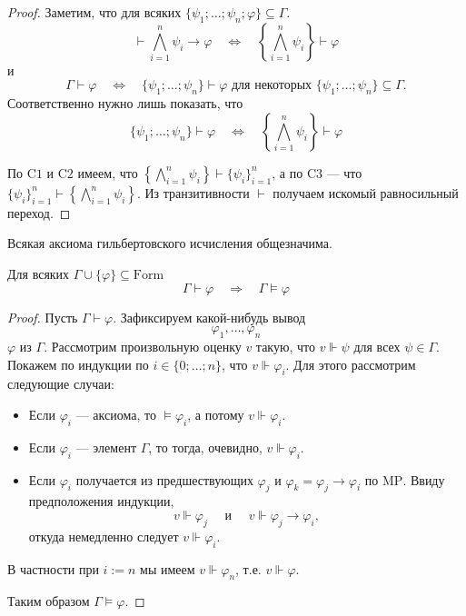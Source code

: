 \documentclass[12pt,a4paper]{article}
\newcommand{\Formul}{\ensuremath{\mathrm{Form}}\xspace}
\begin{document}
    \begin{proof}
        Заметим, что для всяких $\{\psi_1; \dots; \psi_n; \varphi\} \subseteq \Gamma$.
        \[
            \vdash \bigwedge_{i=1}^n \psi_i \rightarrow \varphi
            \quad \Longleftrightarrow \quad
            \left\{\bigwedge_{i=1}^n \psi_i\right\} \vdash \varphi
        \]
        и
        \[
            \Gamma \vdash \varphi
            \quad \Longleftrightarrow \quad
            \{\psi_1; \dots; \psi_n\} \vdash \varphi \text{ для некоторых } \{\psi_1; \dots; \psi_n\} \subseteq \Gamma.
        \]
        Соответственно нужно лишь показать, что
        \[
            \{\psi_1; \dots; \psi_n\} \vdash \varphi
            \quad \Longleftrightarrow \quad
            \left\{\bigwedge_{i=1}^n \psi_i\right\} \vdash \varphi
        \]

        По $\mathrm{C1}$ и $\mathrm{C2}$ имеем, что $\left\{\bigwedge_{i=1}^n \psi_i\right\} \vdash \{\psi_i\}_{i=1}^n$, а по $\mathrm{C3}$ --- что $\{\psi_i\}_{i=1}^n \vdash \left\{\bigwedge_{i=1}^n \psi_i\right\}$. Из транзитивности $\vdash$ получаем искомый равносильный переход.
    \end{proof}

    \begin{lemma}
        Всякая аксиома гильбертовского исчисления общезначима.
    \end{lemma}

    \begin{theorem}\label{Hilbert-conclusion-correctness}
        Для всяких $\Gamma \cup \{\varphi\} \subseteq \Formul$
        \[
            \Gamma \vdash \varphi
            \quad \Longrightarrow \quad
            \Gamma \vDash \varphi
        \]
    \end{theorem}

    \begin{proof}
        Пусть $\Gamma \vdash \varphi$. Зафиксируем какой-нибудь вывод
        \[\varphi_1, \dots, \varphi_n\]
        $\varphi$ из $\Gamma$. Рассмотрим произвольную оценку $v$ такую, что $v \Vdash \psi$ для всех $\psi \in \Gamma$. Покажем по индукции по $i \in \{0; \dots; n\}$, что $v \Vdash \varphi_i$. Для этого рассмотрим следующие случаи:
        \begin{itemize}
            \item Если $\varphi_i$ --- аксиома, то $\vDash \varphi_i$, а потому $v \Vdash \varphi_i$.
            \item Если $\varphi_i$ --- элемент $\Gamma$, то тогда, очевидно, $v \Vdash \varphi_i$.
            \item Если $\varphi_i$ получается из предшествующих $\varphi_j$ и $\varphi_k = \varphi_j \rightarrow \varphi_i$ по $\mathrm{MP}$. Ввиду предположения индукции,
            \[
                v \Vdash \varphi_j
                \quad \text{ и } \quad
                v \Vdash \varphi_j \rightarrow \varphi_i,
            \]
            откуда немедленно следует $v \Vdash \varphi_i$.
        \end{itemize}
        В частности при $i := n$ мы имеем $v \Vdash \varphi_n$, т.е. $v \Vdash \varphi$.

        Таким образом $\Gamma \vDash \varphi$.
    \end{proof}
\end{document}
